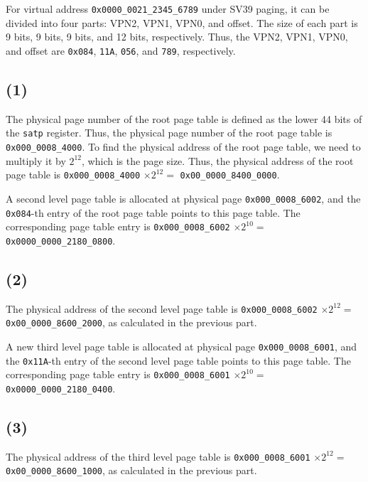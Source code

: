 \documentclass[a4paper,12pt]{article}
\begin{document}
For virtual address \texttt{0x0000\_0021\_2345\_6789} under SV39 paging, it can be divided into four parts: VPN2, VPN1, VPN0, and offset. The size of each part is 9 bits, 9 bits, 9 bits, and 12 bits, respectively. Thus, the VPN2, VPN1, VPN0, and offset are \texttt{0x084}, \texttt{11A}, \texttt{056}, and \texttt{789}, respectively.

\subsection*{(1)}

The physical page number of the root page table is defined as the lower 44 bits of the \texttt{satp} register. Thus, the physical page number of the root page table is \texttt{0x000\_0008\_4000}. To find the physical address of the root page table, we need to multiply it by $2^{12}$, which is the page size. Thus, the physical address of the root page table is \texttt{0x000\_0008\_4000} $\times 2^{12} =$ \texttt{0x00\_0000\_8400\_0000}.

A second level page table is allocated at physical page \texttt{0x000\_0008\_6002}, and the \texttt{0x084}-th entry of the root page table points to this page table. The corresponding page table entry is \texttt{0x000\_0008\_6002} $\times 2^{10} =$ \texttt{0x0000\_0000\_2180\_0800}.

\subsection*{(2)}

The physical address of the second level page table is \texttt{0x000\_0008\_6002} $\times 2^{12} =$ \\ \texttt{0x00\_0000\_8600\_2000}, as calculated in the previous part.

A new third level page table is allocated at physical page \texttt{0x000\_0008\_6001}, and the \texttt{0x11A}-th entry of the second level page table points to this page table. The corresponding page table entry is \texttt{0x000\_0008\_6001} $\times 2^{10} =$ \texttt{0x0000\_0000\_2180\_0400}.

\subsection*{(3)}

The physical address of the third level page table is \texttt{0x000\_0008\_6001} $\times 2^{12} =$ \\ \texttt{0x00\_0000\_8600\_1000}, as calculated in the previous part.
\end{document}
